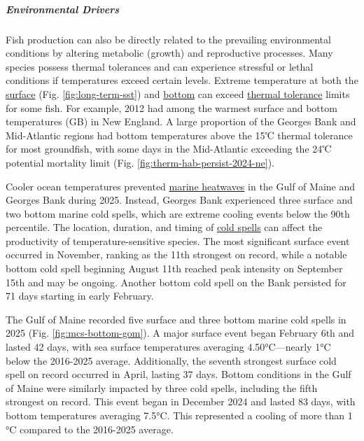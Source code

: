 \documentclass[
  10pt,
]{article}
\begin{document}
\subparagraph{Environmental Drivers}\label{environmental-drivers}

Fish production can also be directly related to the prevailing environmental conditions by altering metabolic (growth) and reproductive processes. Many species possess thermal tolerances and can experience stressful or lethal conditions if temperatures exceed certain levels. Extreme temperature at both the \href{https://noaa-edab.github.io/catalog/seasonal_oisst_anom.html}{surface} (Fig. \ref{fig:long-term-sst}) and \href{https://noaa-edab.github.io/catalog/bottom_temp_model_anom.html}{bottom} can exceed \href{https://noaa-edab.github.io/catalog/thermal_habitat_gridded.html}{thermal tolerance} limits for some fish. For example, 2012 had among the warmest surface and bottom temperatures (GB) in New England. A large proportion of the Georges Bank and Mid-Atlantic regions had bottom temperatures above the 15℃ thermal tolerance for most groundfish, with some days in the Mid-Atlantic exceeding the 24℃ potential mortality limit (Fig. \ref{fig:therm-hab-persist-2024-ne}).

Cooler ocean temperatures prevented \href{https://noaa-edab.github.io/catalog/heatwave.html}{marine heatwaves} in the Gulf of Maine and Georges Bank during 2025. Instead, Georges Bank experienced three surface and two bottom marine cold spells, which are extreme cooling events below the 90th percentile. The location, duration, and timing of \href{https://noaa-edab.github.io/catalog/cold_spell.html}{cold spells} can affect the productivity of temperature-sensitive species. The most significant surface event occurred in November, ranking as the 11th strongest on record, while a notable bottom cold spell beginning August 11th reached peak intensity on September 15th and may be ongoing. Another bottom cold spell on the Bank persisted for 71 days starting in early February.

The Gulf of Maine recorded five surface and three bottom marine cold spells in 2025 (Fig. \ref{fig:mcs-bottom-gom}). A major surface event began February 6th and lasted 42 days, with sea surface temperatures averaging 4.50°C---nearly 1°C below the 2016-2025 average. Additionally, the seventh strongest surface cold spell on record occurred in April, lasting 37 days. Bottom conditions in the Gulf of Maine were similarly impacted by three cold spells, including the fifth strongest on record. This event began in December 2024 and lasted 83 days, with bottom temperatures averaging 7.5°C. This represented a cooling of more than 1 °C compared to the 2016-2025 average.
\end{document}
